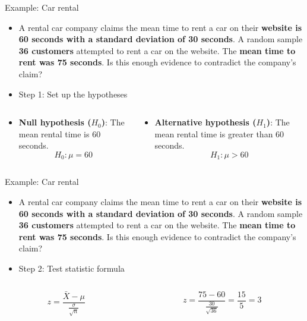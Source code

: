 \documentclass[
  ignorenonframetext,
]{beamer}
\providecommand{\tightlist}{%
  \setlength{\itemsep}{0pt}\setlength{\parskip}{0pt}}
\begin{document}
\begin{frame}{Example: Car rental}
\label{example-car-rental-1}
\begin{itemize}
\item
  A rental car company claims the mean time to rent a car on their
  \textbf{website is 60 seconds with a standard deviation of 30
  seconds}. A random sample \textbf{36 customers} attempted to rent a
  car on the website. The \textbf{mean time to rent was 75 seconds}. Is
  this enough evidence to contradict the company's claim? \vspace{0.5cm}
\item
  Step 1: Set up the hypotheses \vspace{0.5cm}
\end{itemize}

\begin{columns}[T]
\begin{column}{0.5\textwidth}
\begin{itemize}
\tightlist
\item
  \textbf{Null hypothesis (\(H_0\))}: The mean rental time is 60
  seconds. \[
  H_0: \mu = 60
  \]
\end{itemize}
\end{column}

\begin{column}{0.5\textwidth}
\begin{itemize}
\tightlist
\item
  \textbf{Alternative hypothesis (\(H_1\))}: The mean rental time is
  greater than 60 seconds. \[
  H_1: \mu > 60
  \]
\end{itemize}
\end{column}
\end{columns}
\end{frame}

\begin{frame}{Example: Car rental}
\label{example-car-rental-2}
\begin{itemize}
\item
  A rental car company claims the mean time to rent a car on their
  \textbf{website is 60 seconds with a standard deviation of 30
  seconds}. A random sample \textbf{36 customers} attempted to rent a
  car on the website. The \textbf{mean time to rent was 75 seconds}. Is
  this enough evidence to contradict the company's claim? \vspace{0.5cm}
\item
  Step 2: Test statistic formula \vspace{0.5cm}
\end{itemize}

\begin{columns}[T]
\begin{column}{0.5\textwidth}
\[
z = \frac{\bar{X} - \mu}{\frac{\sigma}{\sqrt{n}}}
\]
\end{column}

\begin{column}{0.5\textwidth}
\[
z = \frac{75 - 60}{\frac{30}{\sqrt{36}}} = \frac{15}{5} = 3
\]
\end{column}
\end{columns}
\end{frame}
\end{document}
